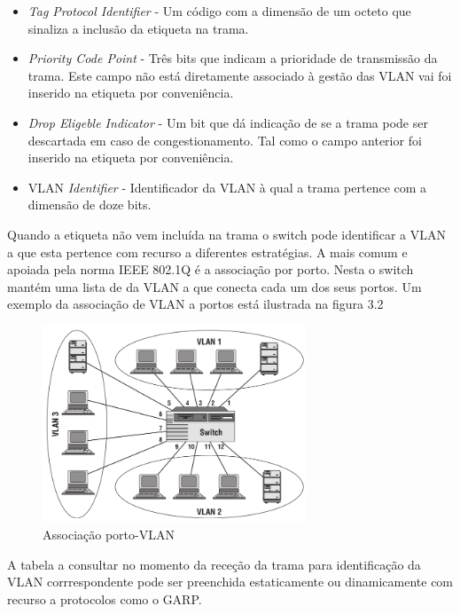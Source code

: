 \begin{itemize}
  \item \textit{Tag Protocol Identifier}  - \quad Um código com a dimensão de um octeto que sinaliza a inclusão da etiqueta na trama.
  \item \textit{Priority Code Point}  - \quad Três bits que indicam a prioridade de transmissão da trama. Este campo não está diretamente associado à gestão das VLAN vai foi inserido na etiqueta por conveniência.
  \item \textit{Drop Eligeble Indicator}  - \quad Um bit que dá indicação de se a trama pode ser descartada em caso de congestionamento. Tal como o campo anterior foi inserido na etiqueta por conveniência.
  \item VLAN \textit{Identifier}  - \quad Identificador da VLAN à qual a trama pertence com a dimensão de doze bits. 
  \end{itemize}

  Quando a etiqueta não vem incluída na trama o switch pode identificar a VLAN a que esta pertence com recurso a diferentes estratégias. A mais comum e apoiada pela norma IEEE 802.1Q é a associação por porto. Nesta o switch mantém uma lista de da VLAN a que conecta cada um dos seus portos. 
  Um exemplo da associação de VLAN a portos está ilustrada na figura 3.2

  
\begin{figure}[H]
  \centering
  \includegraphics[width=0.7\textwidth]{Port_ASS.png}
  \caption[Associação porto-VLAN]{Associação porto-VLAN}
  \label{fig:airbus1}
\end{figure}

A tabela a consultar no momento da receção da trama para identificação da VLAN corrrespondente pode ser preenchida estaticamente ou dinamicamente com recurso a protocolos como o GARP. \par




